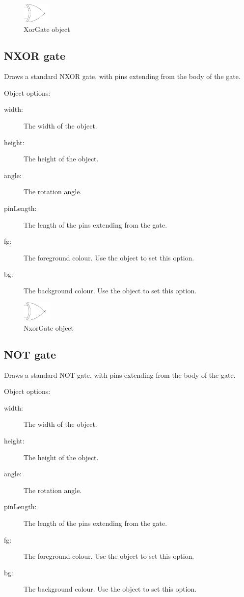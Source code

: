 \begin{figure}[h]
\centerline{\includegraphics[height=1cm]{electronics/XorGate}}
\caption{XorGate object}
\label{fig:Xor_gate}
\end{figure}

\subsection{NXOR gate}
Draws a standard NXOR gate, with pins extending from the body of the gate.

Object options:
\begin{description}
\item[width:] The width of the object.
\item[height:] The height of the object.
\item[angle:] The rotation angle.
\item[pinLength:] The length of the pins extending from the gate.
\item[fg:] The foreground colour.  Use the  object to set this
option.
\item[bg:] The background colour.  Use the  object to set this
option.
\end{description}

\begin{figure}[h]
\centerline{\includegraphics[height=1cm]{electronics/NxorGate}}
\caption{NxorGate object}
\label{fig:Nxor_gate}
\end{figure}

\subsection{NOT gate}
Draws a standard NOT gate, with pins extending from the body of the gate.

Object options:
\begin{description}
\item[width:] The width of the object.
\item[height:] The height of the object.
\item[angle:] The rotation angle.
\item[pinLength:] The length of the pins extending from the gate.
\item[fg:] The foreground colour.  Use the  object to set this
option.
\item[bg:] The background colour.  Use the  object to set this
option.
\end{description}

